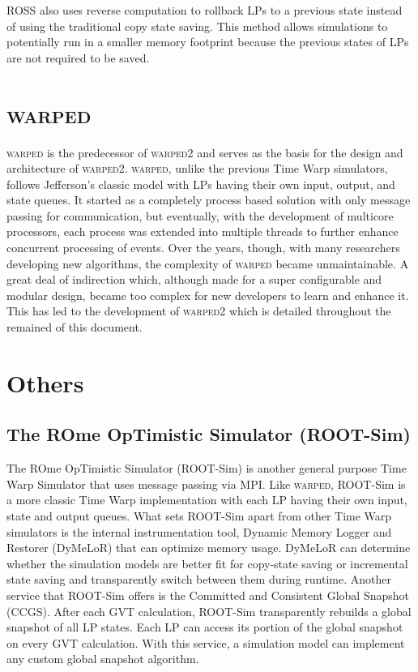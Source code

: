 \documentclass[11pt]{book}
\begin{document}
ROSS also uses reverse computation \cite{carothers-99} to rollback LPs to a previous state instead
of using the traditional copy state saving.  This method allows simulations to potentially run in a
smaller memory footprint because the previous states of LPs are not required to be saved.

\section{\textsc{warped}}

\textsc{warped} \cite{martin-96,ramanan-98-iscope} is the predecessor of \textsc{warped2} and serves
as the basis for the design and architecture of \textsc{warped2}.  \textsc{warped}, unlike the
previous Time Warp simulators, follows Jefferson's classic model with LPs having their own input,
output, and state queues.  It started as a completely process based solution with only message
passing for communication, but eventually, with the development of multicore processors, each
process was extended into multiple threads to further enhance concurrent processing of events.  Over
the years, though, with many researchers developing new algorithms, the complexity of
\textsc{warped} became unmaintainable.  A great deal of indirection which, although made for a super
configurable and modular design, became too complex for new developers to learn and enhance it.
This has led to the development of \textsc{warped2} which is detailed throughout the remained of
this document.

\section{Others}

\subsection{The ROme OpTimistic Simulator (ROOT-Sim)}

The ROme OpTimistic Simulator \cite{pellegrini-11} (ROOT-Sim) is another general purpose Time Warp
Simulator that uses message passing via MPI.  Like \textsc{warped}, ROOT-Sim is a more classic Time
Warp implementation with each LP having their own input, state and output queues.  What sets
ROOT-Sim apart from other Time Warp simulators is the internal instrumentation tool, Dynamic Memory
Logger and Restorer (DyMeLoR) that can optimize memory usage.  DyMeLoR can determine whether the
simulation models are better fit for copy-state saving or incremental state saving and transparently
switch between them during runtime.  Another service that ROOT-Sim offers is the Committed and
Consistent Global Snapshot (CCGS).  After each GVT calculation, ROOT-Sim transparently rebuilds a
global snapshot of all LP states.  Each LP can access its portion of the global snapshot on every
GVT calculation.  With this service, a simulation model can implement any custom global snapshot
algorithm.
\end{document}
